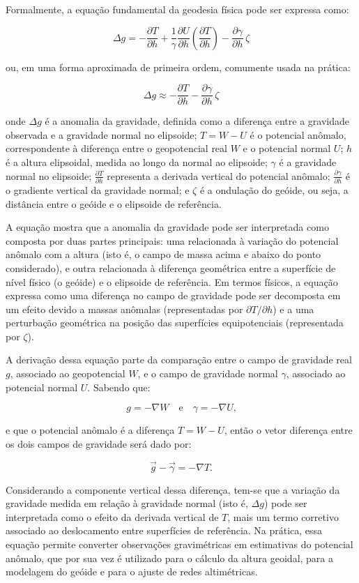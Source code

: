 Formalmente, a equação fundamental da geodesia física pode ser expressa como:

\[
\Delta g = -\frac{\partial T}{\partial h} + \frac{1}{\gamma} \frac{\partial U}{\partial h} \left( \frac{\partial T}{\partial h} \right) - \frac{\partial \gamma}{\partial h} \, \zeta
\]

\noindent
ou, em uma forma aproximada de primeira ordem, comumente usada na prática:

\[
\Delta g \approx -\frac{\partial T}{\partial h} - \frac{\partial \gamma}{\partial h} \, \zeta
\]

\noindent
onde \( \Delta g \) é a anomalia da gravidade, definida como a diferença entre a gravidade observada e a gravidade normal no elipsoide; \( T = W - U \) é o potencial anômalo, correspondente à diferença entre o geopotencial real \( W \) e o potencial normal \( U \); \( h \) é a altura elipsoidal, medida ao longo da normal ao elipsoide; \( \gamma \) é a gravidade normal no elipsoide; \( \frac{\partial T}{\partial h} \) representa a derivada vertical do potencial anômalo; \( \frac{\partial \gamma}{\partial h} \) é o gradiente vertical da gravidade normal; e \( \zeta \) é a ondulação do geóide, ou seja, a distância entre o geóide e o elipsoide de referência.

A equação mostra que a anomalia da gravidade pode ser interpretada como composta por duas partes principais: uma relacionada à variação do potencial anômalo com a altura (isto é, o campo de massa acima e abaixo do ponto considerado), e outra relacionada à diferença geométrica entre a superfície de nível físico (o geóide) e o elipsoide de referência. Em termos físicos, a equação expressa como uma diferença no campo de gravidade pode ser decomposta em um efeito devido a massas anômalas (representadas por \( \partial T/\partial h \)) e a uma perturbação geométrica na posição das superfícies equipotenciais (representada por \( \zeta \)).

A derivação dessa equação parte da comparação entre o campo de gravidade real \( g \), associado ao geopotencial \( W \), e o campo de gravidade normal \( \gamma \), associado ao potencial normal \( U \). Sabendo que:

\[
g = -\nabla W \quad \text{e} \quad \gamma = -\nabla U \text{,}
\]

\noindent
e que o potencial anômalo é a diferença \( T = W - U \), então o vetor diferença entre os dois campos de gravidade será dado por:

\[
\vec{g} - \vec{\gamma} = -\nabla T \text{.}
\]

\noindent
Considerando a componente vertical dessa diferença, tem-se que a variação da gravidade medida em relação à gravidade normal (isto é, \( \Delta g \)) pode ser interpretada como o efeito da derivada vertical de \( T \), mais um termo corretivo associado ao deslocamento entre superfícies de referência. Na prática, essa equação permite converter observações gravimétricas em estimativas do potencial anômalo, que por sua vez é utilizado para o cálculo da altura geoidal, para a modelagem do geóide e para o ajuste de redes altimétricas.